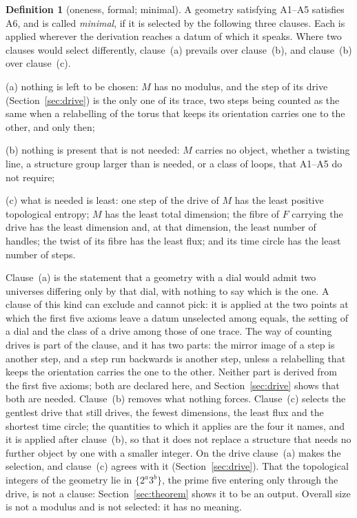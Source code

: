 \documentclass[11pt,a4paper]{article}
\theoremstyle{plain}
\theoremstyle{definition}
\newtheorem{definition}[theorem]{Definition}
\theoremstyle{remark}
\begin{document}
\begin{definition}[oneness, formal; minimal]\label{def:minimal}
A geometry satisfying A1--A5 satisfies A6, and is called \emph{minimal}, if it is selected by the following three clauses. Each is applied wherever the derivation reaches a datum of which it speaks. Where two clauses would select differently, clause~(a) prevails over clause~(b), and clause~(b) over clause~(c).

(a) nothing is left to be chosen: $M$ has no modulus, and the step of its drive (Section~\ref{sec:drive}) is the only one of its trace, two steps being counted as the same when a relabelling of the torus that keeps its orientation carries one to the other, and only then;

(b) nothing is present that is not needed: $M$ carries no object, whether a twisting line, a structure group larger than is needed, or a class of loops, that A1--A5 do not require;

(c) what is needed is least: one step of the drive of $M$ has the least positive topological entropy; $M$ has the least total dimension; the fibre of $F$ carrying the drive has the least dimension and, at that dimension, the least number of handles; the twist of its fibre has the least flux; and its time circle has the least number of steps.
\end{definition}

Clause~(a) is the statement that a geometry with a dial would admit two universes differing only by that dial, with nothing to say which is the one. A clause of this kind can exclude and cannot pick: it is applied at the two points at which the first five axioms leave a datum unselected among equals, the setting of a dial and the class of a drive among those of one trace. The way of counting drives is part of the clause, and it has two parts: the mirror image of a step is another step, and a step run backwards is another step, unless a relabelling that keeps the orientation carries the one to the other. Neither part is derived from the first five axioms; both are declared here, and Section~\ref{sec:drive} shows that both are needed. Clause~(b) removes what nothing forces. Clause~(c) selects the gentlest drive that still drives, the fewest dimensions, the least flux and the shortest time circle; the quantities to which it applies are the four it names, and it is applied after clause~(b), so that it does not replace a structure that needs no further object by one with a smaller integer. On the drive clause~(a) makes the selection, and clause~(c) agrees with it (Section~\ref{sec:drive}). That the topological integers of the geometry lie in $\{2^{a}3^{b}\}$, the prime five entering only through the drive, is not a clause: Section~\ref{sec:theorem} shows it to be an output. Overall size is not a modulus and is not selected: it has no meaning.
\end{document}

